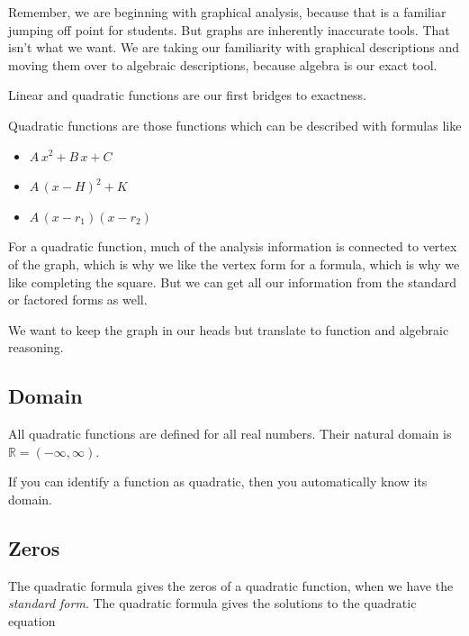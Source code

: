 \documentclass{ximera}
\begin{document}
Remember, we are beginning with graphical analysis, because that is a familiar jumping off point for students.  But graphs are inherently inaccurate tools.  That isn't what we want. We are taking our familiarity with graphical descriptions and moving them over to algebraic descriptions, because algebra is our exact tool. 

Linear and quadratic functions are our first bridges to exactness. 


Quadratic functions are those functions which can be described with formulas like

\begin{itemize}
     \item $A \, x^2 + B \, x + C$
     \item $A \, (x - H)^2 + K$
     \item $A \, (x - r_1) (x-r_2)$
\end{itemize}

For a quadratic function, much of the analysis information is connected to vertex of the graph, which is why we like the vertex form for a formula, which is why we like completing the square.  But we can get all our information from the standard or factored forms as well. 

We want to keep the graph in our heads but translate to function and algebraic reasoning. 





\subsection*{Domain} 

All quadratic functions are defined for all real numbers.  Their natural domain is $\mathbb{R} = (-\infty, \infty)$. 

If you can identify a function as quadratic, then you automatically know its domain. 











\subsection*{Zeros}


The quadratic formula gives the zeros of a quadratic function, when we have the \textit{standard form}. The quadratic formula gives the solutions to the quadratic equation
\end{document}
